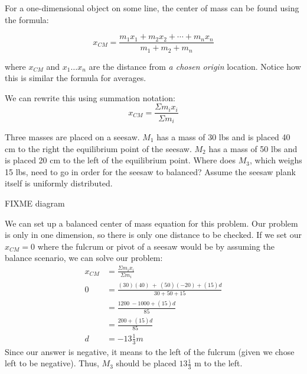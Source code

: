 For a one-dimensional object on some line, the center of mass can be found using the formula:

\begin{mdframed}[style=important, frametitle={1-Dimensional Center of Mass}]
$$x_{CM} = \frac{m_1x_1 + m_2x_2 + \cdots + m_nx_n}{m_1 + m_2 + m_n}$$

where $x_{CM}$ and $x_1 \dots x_n$ are the distance from \emph{a chosen origin} location. Notice how this is similar the formula for averages.

We can rewrite this using summation notation:
$$x_{CM} = \frac{\Sigma m_i x_i}{\Sigma m_i}$$
\end{mdframed}

\begin{Exercise}[title=Balancing a seesaw, label=center_of_mass1]
Three masses are placed on a seesaw. $M_1$ has a mass of 30 lbs and is placed 40 cm to the right the equilibrium point of the seesaw. $M_2$ has a mass of 50 lbs and is placed 20 cm to the left of the equilibrium point. Where does $M_3$, which weighs 15 lbs, need to go in order for the seesaw to balanced? Assume the seesaw plank itself is uniformly distributed.

FIXME diagram
\end{Exercise}
\begin{Answer}[ref=center_of_mass1]
We can set up a balanced center of mass equation for this problem. Our problem is only in one dimension, so there is only one distance to be checked. If we set our $x_{CM} = 0$ where the fulcrum or pivot of a seesaw would be by assuming the balance scenario, we can solve our problem:
\begin{align*}
x_{CM} &= \frac{\Sigma m_i x_i}{\Sigma m_i} \\ 
0 &= \frac{\left(30\right)\left(40\right)\ +\ \left(50\right)\left(-20\right)+\left(15\right)d}{30+50+15} \\
 &= \frac{1200\ -1000 +\left(15\right)d}{85} \\
 &= \frac{200 +\left(15\right)d}{85} \\
d &= -13\tfrac{1}{3} m
\end{align*}
Since our answer is negative, it means to the left of the fulcrum (given we chose left to be negative). Thus, $M_3$ should be placed $13\tfrac{1}{3}$ m to the left.
\end{Answer}

